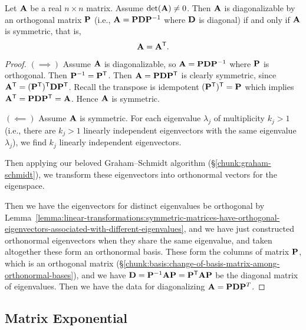 \begin{theorem}\label{thm:spectral-theorem}
  Let $\mathbf{A}$ be a real $n\times n$ matrix. Assume $\det(\mathbf{A})\neq0$.
  Then $\mathbf{A}$ is diagonalizable by an orthogonal matrix $\mathbf{P}$
  (i.e., $\mathbf{A}=\mathbf{P}\mathbf{D}\mathbf{P}^{-1}$ where $\mathbf{D}$ is diagonal) if and only if
  $\mathbf{A}$ is symmetric, that is,
\begin{equation}
\mathbf{A} = \mathbf{A}^{\mathsf{T}}.
\end{equation}
\end{theorem}

\begin{proof}
$(\implies)$ Assume $\mathbf{A}$ is diagonalizable, so $\mathbf{A}=\mathbf{P}\mathbf{D}\mathbf{P}^{-1}$
  where $\mathbf{P}$ is orthogonal. Then $\mathbf{P}^{-1} = \mathbf{P}^{\mathsf{T}}$.
  Then $\mathbf{A} = \mathbf{P}\mathbf{D}\mathbf{P}^{\mathsf{T}}$ is clearly
  symmetric, since $\mathbf{A}^{\mathsf{T}}=(\mathbf{P}^{\mathsf{T}})^{\mathsf{T}}\mathbf{D}\mathbf{P}^{\mathsf{T}}$.
  Recall the transpose is idempotent $(\mathbf{P}^{\mathsf{T}})^{\mathsf{T}}=\mathbf{P}$
  which implies $\mathbf{A}^{\mathsf{T}}=\mathbf{P}\mathbf{D}\mathbf{P}^{\mathsf{T}}=\mathbf{A}$.
  Hence $\mathbf{A}$ is symmetric.

  \medbreak
  $(\impliedby)$ Assume $\mathbf{A}$ is symmetric.
For each eigenvalue $\lambda_{j}$ of multiplicity $k_{j}>1$ (i.e., there
are $k_{j}>1$ linearly independent eigenvectors with the same eigenvalue
$\lambda_{j}$), we find $k_{j}$ linearly independent eigenvectors.

Then applying our beloved Graham--Schmidt algorithm
(\S\ref{chunk:graham-schmidt}), we transform these eigenvectors into
orthonormal vectors for the eigenspace.


Then we have the eigenvectors for distinct eigenvalues be orthogonal by Lemma~\ref{lemma:linear-transformations:symmetric-matrices-have-orthogonal-eigenvectors-associated-with-different-eigenvalues},
and we have just constructed orthonormal eigenvectors when they share
the same eigenvalue, and taken altogether these form an orthonormal
basis. These
form the columns of matrix $\mathbf{P}$, which is an orthogonal matrix (\S\ref{chunk:basis:change-of-basis-matrix-among-orthonormal-bases}), and
we have $\mathbf{D}=\mathbf{P}^{-1}\mathbf{A}\mathbf{P}=\mathbf{P}^{\mathsf{T}}\mathbf{A}\mathbf{P}$
be the diagonal matrix of eigenvalues. Then we have the data for
diagonalizing $\mathbf{A}=\mathbf{P}\mathbf{D}\mathbf{P}^{T}$.
\end{proof}

\subsection{Matrix Exponential}

